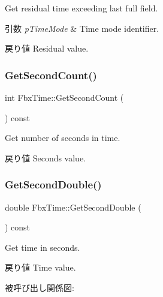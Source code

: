 Get residual time exceeding last full field. 
\begin{DoxyParams}{引数}
{\em p\+Time\+Mode} & Time mode identifier. \\
\hline
\end{DoxyParams}
\begin{DoxyReturn}{戻り値}
Residual value. 
\end{DoxyReturn}
\mbox{\label{class_fbx_time_abccce651a65f2c4232cc238f35c3a5d4}} 
\subsubsection{\texorpdfstring{Get\+Second\+Count()}{GetSecondCount()}}
{\footnotesize\ttfamily int Fbx\+Time\+::\+Get\+Second\+Count (\begin{DoxyParamCaption}{ }\end{DoxyParamCaption}) const}

Get number of seconds in time. \begin{DoxyReturn}{戻り値}
Seconds value. 
\end{DoxyReturn}
\mbox{\label{class_fbx_time_a11db10305535e388b8b2afb1b2bb89e6}} 
\subsubsection{\texorpdfstring{Get\+Second\+Double()}{GetSecondDouble()}}
{\footnotesize\ttfamily double Fbx\+Time\+::\+Get\+Second\+Double (\begin{DoxyParamCaption}{ }\end{DoxyParamCaption}) const}

Get time in seconds. \begin{DoxyReturn}{戻り値}
Time value. 
\end{DoxyReturn}
被呼び出し関係図\+:
\mbox{\label{class_fbx_time_a3d36e985f2da20e855fa23906c97ed35}} 
